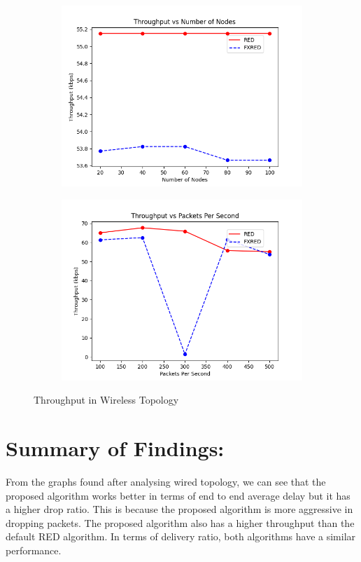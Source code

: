 \documentclass[10pt]{report}
\begin{document}
\begin{figure}
\begin{subfigure}{.5\textwidth}
        \includegraphics[width=1\linewidth]{static/graphs/wireless/Throughput vs Number of Nodes.png}
    \end{subfigure}%
    \begin{subfigure}{.5\textwidth}
        \includegraphics[width=1\linewidth]{static/graphs/wireless/Throughput vs Packets Per Second.png}
    \end{subfigure}
    \caption{Throughput in Wireless Topology}
    \label{fig:wireless_throughput}
\end{figure}

\section*{Summary of Findings:}
From the graphs found after analysing wired topology, we can see that the proposed algorithm works better in terms of end to end average delay but it has a higher drop ratio. This is because the proposed algorithm is more aggressive in dropping packets. The proposed algorithm also has a higher throughput than the default RED algorithm. In terms of delivery ratio, both algorithms have a similar performance.
\end{document}
